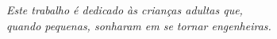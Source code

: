 \begin{dedicatoria}
   \vspace*{\fill}
   \centering
   \noindent
    \textit{Este trabalho é dedicado às crianças adultas que,\\
    quando pequenas, sonharam em se tornar engenheiras.} 
   \vspace*{\fill}
\end{dedicatoria}